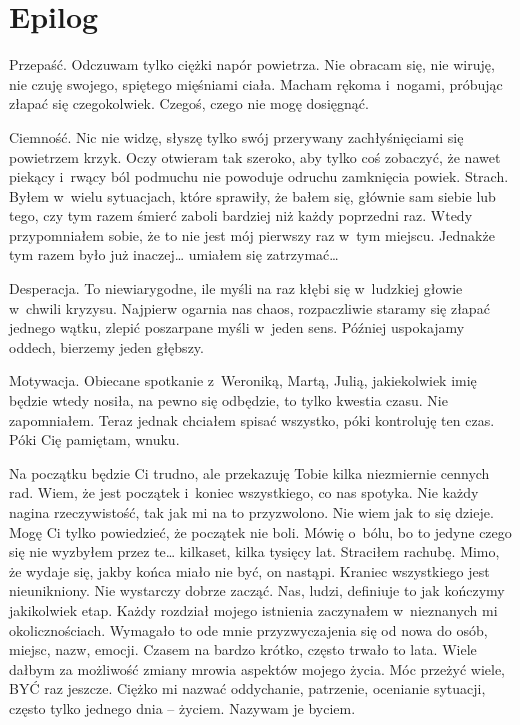 \chapter{Epilog}

Przepaść. Odczuwam tylko ciężki napór powietrza. Nie obracam się, nie wiruję, nie czuję swojego, spiętego mięśniami 
ciała. Macham rękoma i~nogami, próbując złapać się czegokolwiek. Czegoś, czego nie mogę dosięgnąć.

Ciemność. Nic nie widzę, słyszę tylko swój przerywany zachłyśnięciami się powietrzem krzyk. Oczy otwieram tak 
szeroko, aby tylko coś zobaczyć, że nawet piekący i~rwący ból podmuchu nie powoduje odruchu zamknięcia powiek.
Strach. Byłem w~wielu sytuacjach, które sprawiły, że bałem się, głównie sam siebie lub tego, czy tym razem śmierć 
zaboli bardziej niż każdy poprzedni raz. Wtedy przypomniałem sobie, że to nie jest mój pierwszy raz w~tym miejscu. 
Jednakże tym razem było już inaczej… umiałem się zatrzymać…

Desperacja. To niewiarygodne, ile myśli na raz kłębi się w~ludzkiej głowie w~chwili kryzysu. Najpierw ogarnia nas 
chaos, rozpaczliwie staramy się złapać jednego wątku, zlepić poszarpane myśli w~jeden sens. Później uspokajamy 
oddech, bierzemy jeden głębszy.

Motywacja. Obiecane spotkanie z~Weroniką, Martą, Julią, jakiekolwiek imię będzie wtedy nosiła, na pewno się odbędzie, 
to tylko kwestia czasu. Nie zapomniałem. Teraz jednak chciałem spisać wszystko, póki kontroluję ten czas. Póki Cię 
pamiętam, wnuku.

\paraSep

Na początku będzie Ci trudno, ale przekazuję Tobie kilka niezmiernie cennych rad. Wiem, że jest początek i~koniec 
wszystkiego, co nas spotyka. Nie każdy nagina rzeczywistość, tak jak mi na to przyzwolono. Nie wiem jak to się 
dzieje. Mogę Ci tylko powiedzieć, że początek nie boli. Mówię o~bólu, bo to jedyne czego się nie wyzbyłem przez te… 
kilkaset, kilka tysięcy lat. Straciłem rachubę. Mimo, że wydaje się, jakby końca miało nie być, on nastąpi. Kraniec 
wszystkiego jest nieunikniony. Nie wystarczy dobrze zacząć. Nas, ludzi, definiuje to jak kończymy jakikolwiek etap. 
Każdy rozdział mojego istnienia zaczynałem w~nieznanych mi okolicznościach. Wymagało to ode mnie przyzwyczajenia się 
od nowa do osób, miejsc, nazw, emocji. Czasem na bardzo krótko, często trwało to lata. Wiele dałbym za możliwość 
zmiany mrowia aspektów mojego życia. Móc przeżyć wiele, BYĆ raz jeszcze. Ciężko mi nazwać oddychanie, patrzenie, 
ocenianie sytuacji, często tylko jednego dnia -- życiem. Nazywam je byciem.

